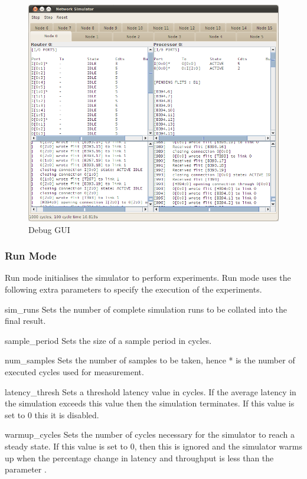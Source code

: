 \documentclass[10pt,a4paper]{article}
\begin{document}
\begin{figure}[ht]
\begin{center}
\includegraphics[scale=0.5]{debug.png}
\end{center}
\caption{Debug GUI}
\label{fig:debuggui}
\end{figure}

\subsubsection{Run Mode}

Run mode initialises the simulator to perform experiments. Run mode uses the
following extra parameters to specify the execution of the experiments.

\begin{paramlist}

\item[sim\_runs] Sets the number of complete simulation runs to be collated into
the final result.

\item[sample\_period] Sets the size of a sample period in cycles.

\item[num\_samples] Sets the number of samples to be taken, hence
 *  is the number of executed cycles used
for measurement. 

\item[latency\_thresh] Sets a threshold latency value in cycles. If the average
latency in the simulation exceeds this value then the simulation terminates. If
this value is set to 0 this it is disabled.

\item[warmup\_cycles] Sets the number of cycles necessary for the simulator to
reach a steady state. If this value is set to 0, then this is ignored and the
simulator warms up when the percentage change in latency and throughput is less
than the parameter .

\end{paramlist}
\end{document}
